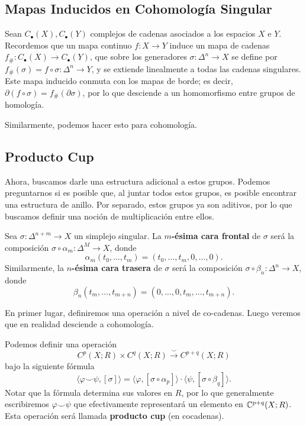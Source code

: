 \subsection{Mapas Inducidos en Cohomología Singular}

Sean $C_{\bullet}(X), C_{\bullet}(Y)$ complejos de cadenas asociados a los espacios $X$ e $Y$. Recordemos que un mapa continuo $f \colon X \to Y$ induce un mapa de cadenas $f_{\#} \colon C_{\bullet}(X) \to C_{\bullet}(Y)$, que sobre los generadores $\sigma \colon \Delta^{n} \to X$ se define por $f_{\#}(\sigma) = f \circ \sigma \colon \Delta^{n} \to Y$, y se extiende linealmente a todas las cadenas singulares. Este mapa inducido conmuta con los mapas de borde; es decir, $\partial(f \circ \sigma) = f_{\#}(\partial \sigma)$, por lo que desciende a un homomorfismo entre grupos de homología. \par
Similarmente, podemos hacer esto para cohomología.

\subsection{Producto Cup}

Ahora, buscamos darle una estructura adicional a estos grupos. Podemos preguntarnos si es posible que, al juntar todos estos grupos, es posible encontrar una estructura de anillo. Por separado, estos grupos ya son aditivos, por lo que buscamos definir una noción de multiplicación entre ellos.

\begin{definition}
	Sea $\sigma \colon \Delta^{n+m} \to X$ un simplejo singular. La \textbf{$m$-ésima cara frontal} de $\sigma$ será la composición $\sigma \circ \alpha_{m} \colon \Delta^{M} \to X$, donde
	\[ \alpha_{m}(t_{0},\dots,t_{m}) = (t_{0},\dots,t_{m}, 0, \dots, 0). \]
	Similarmente, la \textbf{$n$-ésima cara trasera} de $\sigma$ será la composición $\sigma \circ \beta_{n} \colon \Delta^{n} \to X$, donde
	\[ \beta_{n}(t_{m}, \dots, t_{m+n}) = (0,\dots,0,t_{m},\dots,t_{m+n}). \]
\end{definition}

En primer lugar, definiremos una operación a nivel de co-cadenas. Luego veremos que en realidad desciende a cohomología.

\begin{definition}
	Podemos definir una operación
	\[ C^{p}(X;R) \times C^{q}(X;R) \xrightarrow{\smile} C^{p+q}(X;R) \]
	bajo la siguiente fórmula
	\[ \langle \varphi \smile \psi, [\sigma] \rangle = \langle \varphi, [\sigma \circ \alpha_{p}] \rangle \cdot \langle \psi, [\sigma \circ \beta_{q}] \rangle. \]
	Notar que la fórmula determina sus valores en $R$, por lo que generalmente escribiremos $\varphi \smile \psi$ que efectivamente representará un elemento en $\mathbb{C}^{p+q}(X;R)$. Esta operación será llamada \textbf{producto cup} (en cocadenas).
\end{definition}

